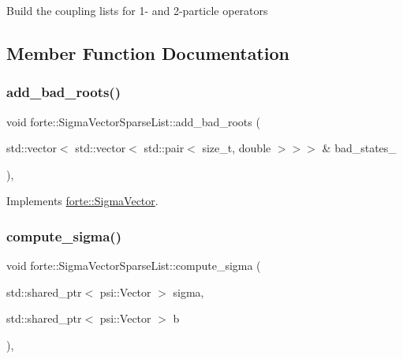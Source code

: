 Build the coupling lists for 1-\/ and 2-\/particle operators 

\subsection{Member Function Documentation}
\mbox{\label{classforte_1_1_sigma_vector_sparse_list_a1fa83f96983a54077f5982befce39858}} 
\subsubsection{\texorpdfstring{add\+\_\+bad\+\_\+roots()}{add\_bad\_roots()}}
{\footnotesize\ttfamily void forte\+::\+Sigma\+Vector\+Sparse\+List\+::add\+\_\+bad\+\_\+roots (\begin{DoxyParamCaption}\item[{std\+::vector$<$ std\+::vector$<$ std\+::pair$<$ size\+\_\+t, double $>$$>$$>$ \&}]{bad\+\_\+states\+\_\+ }\end{DoxyParamCaption})\hspace{0.3cm}{\ttfamily [override]}, {\ttfamily [virtual]}}



Implements \mbox{\hyperlink{classforte_1_1_sigma_vector_a5cd950852f515bc082ca1df31bd84e3e}{forte\+::\+Sigma\+Vector}}.

\mbox{\label{classforte_1_1_sigma_vector_sparse_list_a5f5e4c5457fd9b0511e7c42824dde927}} 
\subsubsection{\texorpdfstring{compute\+\_\+sigma()}{compute\_sigma()}}
{\footnotesize\ttfamily void forte\+::\+Sigma\+Vector\+Sparse\+List\+::compute\+\_\+sigma (\begin{DoxyParamCaption}\item[{std\+::shared\+\_\+ptr$<$ psi\+::\+Vector $>$}]{sigma,  }\item[{std\+::shared\+\_\+ptr$<$ psi\+::\+Vector $>$}]{b }\end{DoxyParamCaption})\hspace{0.3cm}{\ttfamily [override]}, {\ttfamily [virtual]}}




